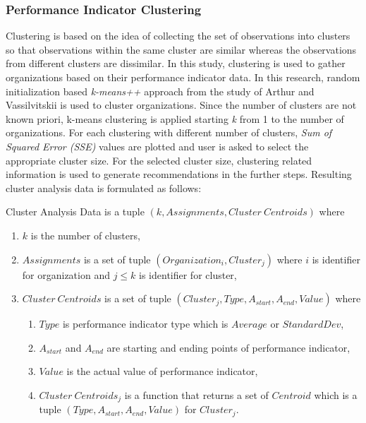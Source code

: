 \subsubsection{Performance Indicator Clustering}
\label{subsubsec:performance-indicator-clustering}
Clustering is based on the idea of collecting the set of observations into clusters so that observations within the same cluster are similar whereas the observations from different clusters are dissimilar. In this study, clustering is used to gather organizations based on their performance indicator data. In this research, random initialization based \textit{k-means++} approach from the study of Arthur and Vassilvitskii \cite{arthur2007} is used to cluster organizations. Since the number of clusters are not known priori, k-means clustering is applied starting \textit{k} from 1 to the number of organizations. For each clustering with different number of clusters, \textit{Sum of Squared Error (SSE)} values are plotted and user is asked to select the appropriate cluster size. For the selected cluster size, clustering related information is used to generate recommendations in the further steps. Resulting cluster analysis data is formulated as follows:
\theoremstyle{definition}
\begin{definition}
Cluster Analysis Data is a tuple $(k, Assignments, Cluster\ Centroids)$ where
\begin{enumerate}
  \item $k$ is the number of clusters,
  \item $Assignments$ is a set of tuple $(Organization_{i}, Cluster_{j})$ where $i$ is identifier for organization and $j \leq k$ is identifier for cluster,
  \item $Cluster\ Centroids$ is a set of tuple $(Cluster_{j}, Type, A_{start}, A_{end}, Value)$ where
    \begin{enumerate}
      \item $Type$ is performance indicator type which is $Average$ or $StandardDev$,
      \item $A_{start}$ and $A_{end}$ are starting and ending points of performance indicator,
      \item $Value$ is the actual value of performance indicator,
      \item $Cluster\ Centroids_{j}$ is a function that returns a set of $Centroid$ which is a tuple $(Type, A_{start}, A_{end}, Value)$ for $Cluster_{j}$.
    \end{enumerate} 
\end{enumerate}
\end{definition}

